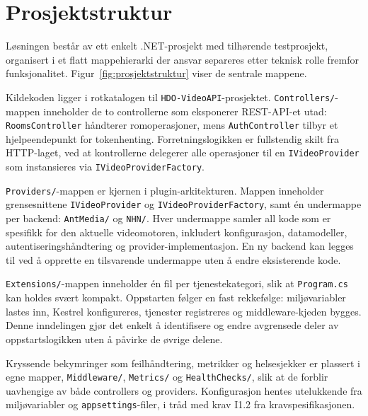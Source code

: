 \section{Prosjektstruktur}
\label{sec:prosjektstruktur}

Løsningen består av ett enkelt .NET-prosjekt med tilhørende testprosjekt, organisert i et flatt mappehierarki der ansvar separeres etter teknisk rolle fremfor funksjonalitet. Figur~\ref{fig:prosjektstruktur} viser de sentrale mappene.

Kildekoden ligger i rotkatalogen til \texttt{HDO-VideoAPI}-prosjektet. \texttt{Controllers/}-mappen inneholder de to controllerne som eksponerer REST-API-et utad: \texttt{RoomsController} håndterer romoperasjoner, mens \texttt{AuthController} tilbyr et hjelpeendepunkt for tokenhenting.
Forretningslogikken er fullstendig skilt fra HTTP-laget, ved at kontrollerne delegerer alle operasjoner til en \texttt{IVideoProvider} som instansieres via \texttt{IVideoProviderFactory}.

\texttt{Providers/}-mappen er kjernen i plugin-arkitekturen. Mappen inneholder grensesnittene \texttt{IVideoProvider} og \texttt{IVideoProviderFactory}, samt én undermappe per backend: \texttt{AntMedia/} og \texttt{NHN/}. Hver undermappe samler all kode som er spesifikk for den aktuelle videomotoren, inkludert konfigurasjon, datamodeller, autentiseringshåndtering og provider-implementasjon. En ny backend kan legges til ved å opprette en tilsvarende undermappe uten å endre eksisterende kode.

\texttt{Extensions/}-mappen inneholder én fil per tjenestekategori, slik at \texttt{Program.cs} kan holdes svært kompakt. Oppstarten følger en fast rekkefølge: miljøvariabler lastes inn, Kestrel konfigureres, tjenester registreres og middleware-kjeden bygges. Denne inndelingen gjør det enkelt å identifisere og endre avgrensede deler av oppstartslogikken uten å påvirke de øvrige delene.

Kryssende bekymringer som feilhåndtering, metrikker og helsesjekker er plassert i egne mapper, \texttt{Middleware/}, \texttt{Metrics/} og \texttt{HealthChecks/}, slik at de forblir uavhengige av både controllers og providers. Konfigurasjon hentes utelukkende fra miljøvariabler og
\texttt{appsettings}-filer, i tråd med krav I1.2 \cite{hdo_kravspec} fra kravspesifikasjonen.

